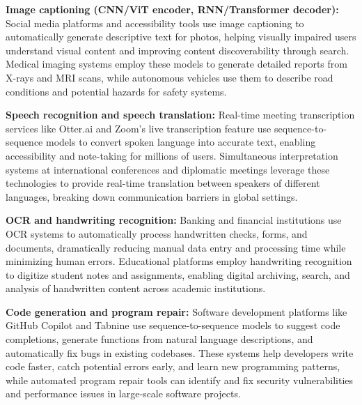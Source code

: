 \textbf{Image captioning (CNN/ViT encoder, RNN/Transformer decoder):} Social media platforms and accessibility tools use image captioning to automatically generate descriptive text for photos, helping visually impaired users understand visual content and improving content discoverability through search. Medical imaging systems employ these models to generate detailed reports from X-rays and MRI scans, while autonomous vehicles use them to describe road conditions and potential hazards for safety systems.

\textbf{Speech recognition and speech translation:} Real-time meeting transcription services like Otter.ai and Zoom's live transcription feature use sequence-to-sequence models to convert spoken language into accurate text, enabling accessibility and note-taking for millions of users. Simultaneous interpretation systems at international conferences and diplomatic meetings leverage these technologies to provide real-time translation between speakers of different languages, breaking down communication barriers in global settings.

\textbf{OCR and handwriting recognition:} Banking and financial institutions use OCR systems to automatically process handwritten checks, forms, and documents, dramatically reducing manual data entry and processing time while minimizing human errors. Educational platforms employ handwriting recognition to digitize student notes and assignments, enabling digital archiving, search, and analysis of handwritten content across academic institutions.

\textbf{Code generation and program repair:} Software development platforms like GitHub Copilot and Tabnine use sequence-to-sequence models to suggest code completions, generate functions from natural language descriptions, and automatically fix bugs in existing codebases. These systems help developers write code faster, catch potential errors early, and learn new programming patterns, while automated program repair tools can identify and fix security vulnerabilities and performance issues in large-scale software projects.

